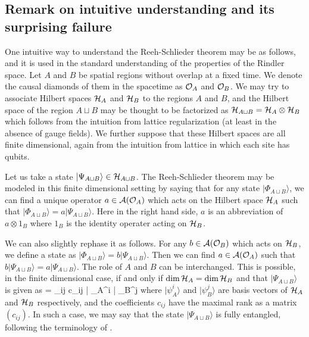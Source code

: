 \documentclass[12pt,a4paper]{article}
\theoremstyle{plain}
\theoremstyle{definition}
\numberwithin{thm}{section}
\newcommand{\ket}[1]{ | {#1} \rangle }
\def\CA{{\cal A}}
\def\CH{{\cal H}}
\def\CO{{\cal O}}
\def\beq#1\eeq{\begin{align}#1\end{align}}
\begin{document}
\subsection{Remark on intuitive understanding and its surprising failure}


One intuitive way to understand the Reeh-Schlieder theorem may be as follows, and it is used in the standard understanding of the properties of the Rindler space.
Let $A$ and $B$ be spatial regions without overlap at a fixed time. We denote the causal diamonds of them in the spacetime as $\CO_A$ and $\CO_B$.
We may try to associate Hilbert spaces $\CH_A$ and $\CH_B$ to the regions $A$ and $B$, and the Hilbert space of the region $A \sqcup B$
may be thought to be factorized as $\CH_{A \sqcup B} =\CH_A \otimes \CH_B$ which follows from the intuition from lattice regularization (at least in the absence of gauge fields). 
We further suppose that these Hilbert spaces are all finite dimensional, again from the intuition from lattice in which each site has qubits.

Let us take a state $\ket{\Psi_{A \sqcup B}} \in \CH_{A \sqcup B}$. The Reeh-Schlieder theorem may be modeled in this finite dimensional setting
by saying that for any state $\ket{\Phi_{A \sqcup B}} $,
we can find a unique operator $a \in \CA(\CO_A)$ which acts on the Hilbert space $\CH_A$ such that $\ket{\Phi_{A \sqcup B}} = a \ket{\Psi_{A \sqcup B}}$.
Here in the right hand side, $a$ is an abbreviation of $a \otimes 1_B$ where $1_B$ is the identity operater acting on $\CH_B$.

We can also slightly rephase it as follows. For any $b \in \CA(\CO_B)$ which acts on $\CH_B$, we define a state as $\ket{\Phi_{A \sqcup B}} =b \ket{\Psi_{A \sqcup B}} $.
Then we can find $a \in \CA(\CO_A)$ such that $b \ket{\Psi_{A \sqcup B}} = a \ket{\Psi_{A \sqcup B}}$. The role of $A$ and $B$ can be interchanged.
This is possible, in the finite dimensional case, if and only if $\dim \CH_A = \dim \CH_B$ and that
$\ket{\Psi_{A \sqcup B}}$ is given as
\beq
\ket{\Psi_{A \sqcup B}} = \sum_{ij} c_{ij}\ket{\psi_A^i} \otimes \ket{\psi_B^j}
\eeq
where $\ket{\psi_A^i} $ and $ \ket{\psi_B^j}$ are basis vectors of $\CH_A$ and $\CH_B$ respectively, and the coefficients $c_{ij}$
have the maximal rank as a matrix $(c_{ij})$. In such a case, we may say that
the state $\ket{\Psi_{A \sqcup B}} $ is fully entangled, following the terminology of \cite{Witten:2018zxz}.
\end{document}
